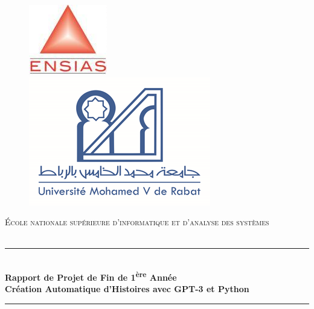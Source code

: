 \documentclass[11,5pt]{report}
\begin{document}
\begin{spacing}{2}
\newcommand{\HRule}{\rule{\linewidth}{0.5mm}}
\begin{titlepage}
\begin{center}

\begin{figure}[h]
		\begin{minipage}[c]{.46\linewidth}
			\flushleft
			\includegraphics[height=100 pt, width=120 pt]{images/ensias_logo.png}
		
		\end{minipage}
		\hfill%
		\begin{minipage}[c]{.46\linewidth}
			\flushright
			\includegraphics[height=100 pt, width=120 pt]{images/um5.png}
		
		\end{minipage}
\end{figure}
\vspace{1cm}
\textsc{\Large École nationale supérieure d'informatique et d'analyse des systèmes}\\[0.3cm]

\textsc{\Large }\\[0.5cm]

\HRule \\[0.4cm]

{\huge \bfseries Rapport de Projet de Fin de 1\textsuperscript{ère} Année\\[0.2cm]}
{\huge \bfseries Création Automatique d'Histoires avec GPT-3 et Python\\[0.4cm]}

\HRule \\[1.5cm]


\end{center}
\end{titlepage}
\end{spacing}
\end{document}
